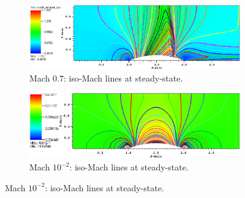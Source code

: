 \documentclass[preprint,10pt]{elsarticle}
\begin{document}
\begin{figure}[H]
        \centering
        \begin{subfigure}[b]{0.5\textwidth}
                \centering
                \includegraphics[width=\textwidth]{Hump2D_mach_0p7.png}
                \caption{Mach $0.7$: iso-Mach lines at steady-state.}
                \label{fig:2d_hump_mach_0p7}
        \end{subfigure}%
        \begin{subfigure}[b]{0.5\textwidth}
                \centering
                \includegraphics[width=\textwidth]{Hump2D_mach_0p01.png}
                \caption{Mach $10^{-2}$: iso-Mach lines at steady-state.}
                \label{fig:2d_hump_mach_0p01}
        \end{subfigure}%
        

\end{figure}
\end{document}
